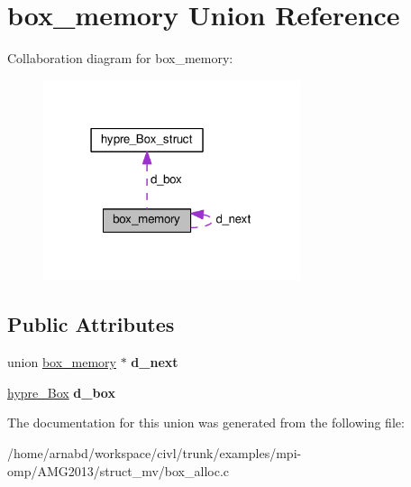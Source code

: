\hypertarget{unionbox__memory}{}\section{box\+\_\+memory Union Reference}
\label{unionbox__memory}


Collaboration diagram for box\+\_\+memory\+:
\nopagebreak
\begin{figure}[H]
\begin{center}
\leavevmode
\includegraphics[width=214pt]{unionbox__memory__coll__graph}
\end{center}
\end{figure}
\subsection*{Public Attributes}
\begin{DoxyCompactItemize}
\item 
\hypertarget{unionbox__memory_ae88accf67ca286e2f0efe29d5722e46a}{}union \hyperlink{unionbox__memory}{box\+\_\+memory} $\ast$ {\bfseries d\+\_\+next}\label{unionbox__memory_ae88accf67ca286e2f0efe29d5722e46a}

\item 
\hypertarget{unionbox__memory_ac7a82bfeb3fb6d84205fc252b9884806}{}\hyperlink{structhypre__Box__struct}{hypre\+\_\+\+Box} {\bfseries d\+\_\+box}\label{unionbox__memory_ac7a82bfeb3fb6d84205fc252b9884806}

\end{DoxyCompactItemize}


The documentation for this union was generated from the following file\+:\begin{DoxyCompactItemize}
\item 
/home/arnabd/workspace/civl/trunk/examples/mpi-\/omp/\+A\+M\+G2013/struct\+\_\+mv/box\+\_\+alloc.\+c\end{DoxyCompactItemize}
